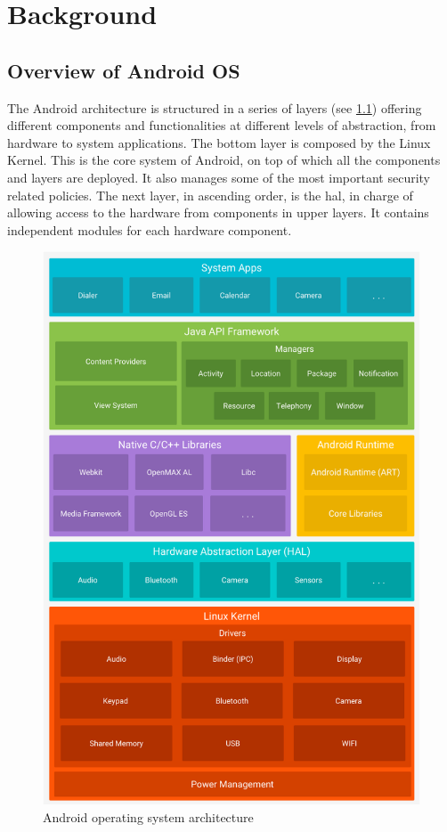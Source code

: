 \chapter{Background}

\section{Overview of Android OS}

The Android architecture
is structured in a series of layers (see \ref{fig:androidsystem}) offering different components and functionalities at different levels of abstraction, from hardware to system applications.
The bottom layer is composed by the Linux Kernel. This is the core system of Android, on top
of which all the components and layers are deployed. It also manages some of the most important security related policies. The next layer, in ascending order, is the \ac{hal}, in charge of allowing access to the hardware from components in upper layers.
It contains independent modules for each hardware component.

\begin{figure}[htbp]
  \centering
  \includegraphics[scale=0.65]{./Figure/androidsystem.png}
  \caption{Android operating system architecture}
  \label{fig:androidsystem}
\end{figure}

